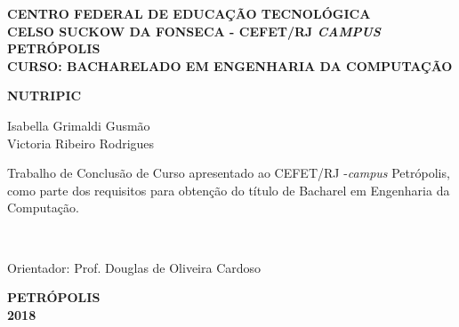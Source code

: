 \begin{center}
{\large \bf CENTRO FEDERAL DE EDUCAÇÃO TECNOLÓGICA} \vspace{1mm} \\
{\large \bf CELSO SUCKOW DA FONSECA - CEFET/RJ \textit{CAMPUS} PETRÓPOLIS} \vspace{1mm} \\
{\large \bf CURSO: BACHARELADO EM ENGENHARIA DA COMPUTAÇÃO}

\vspace*{3cm}
\normalsize{\large \bf NUTRIPIC}\\
\end{center}
\vspace{1.5cm}
\hfill
	\begin{flushright}
	Isabella Grimaldi Gusmão \\
	Victoria Ribeiro Rodrigues
	\end{flushright}
\vspace*{1.5cm}
\begin{flushright}
	\begin{minipage}{0.5\textwidth}
		{\normalsize
		Trabalho de Conclusão de Curso apresentado ao  
	 CEFET/RJ -{\it campus} Petrópolis, como parte dos requisitos para obtenção do título de Bacharel em Engenharia da Computação.}
	\end{minipage}\\[1.5cm]
\end{flushright}
\vspace{1.5cm}
\hfill
\begin{flushright}
Orientador: Prof. Douglas de Oliveira Cardoso
\end{flushright}




\vspace*{3.3cm}
\begin{center}
{\bf PETRÓPOLIS \\ 2018}\\
\end{center}



